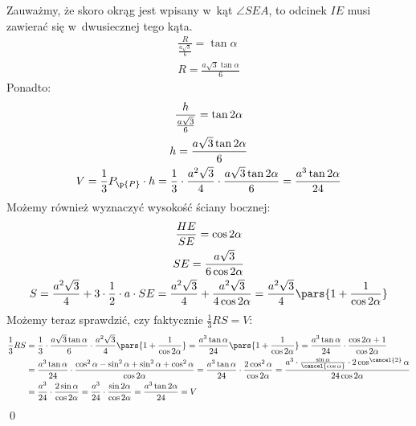 \noindent
Zauważmy, że skoro okrąg jest wpisany w~kąt \(\angle{SEA}\), to odcinek \(IE\) musi zawierać się w~dwusiecznej tego kąta.
\begin{gather*}
    \frac{R}{\frac{a\sqrt{3}}{6}} = \tan\alpha\\
    R = \frac{a\sqrt{3}\tan\alpha}{6}
\end{gather*}
Ponadto:
\begin{gather*}
    \frac{h}{\frac{a\sqrt{3}}{6}} = \tan2\alpha\\
    h = \frac{a\sqrt{3}\tan2\alpha}{6}\\
    V
    = \frac{1}{3}P_\p{P} \cdot h
    = \frac{1}{3} \cdot \frac{a^2\sqrt{3}}{4} \cdot \frac{a\sqrt{3}\tan2\alpha}{6}
    = \frac{a^3\tan2\alpha}{24}
\end{gather*}
Możemy również wyznaczyć wysokość ściany bocznej:
\begin{gather*}
    \frac{HE}{SE} = \cos2\alpha\\
    SE = \frac{a\sqrt{3}}{6\cos2\alpha}\\
    S
    = \frac{a^2\sqrt{3}}{4} + 3 \cdot \frac{1}{2} \cdot a \cdot SE
    = \frac{a^2\sqrt{3}}{4} + \frac{a^2\sqrt{3}}{4\cos2\alpha}
    = \frac{a^2\sqrt{3}}{4}\pars{1 + \frac{1}{\cos2\alpha}}
\end{gather*}
Możemy teraz sprawdzić, czy faktycznie \(\frac{1}{3}RS = V\):
\begin{equation*}
    \begin{split}
        \frac{1}{3}RS
        &= \frac{1}{3} \cdot \frac{a\sqrt{3}\tan\alpha}{6} \cdot \frac{a^2\sqrt{3}}{4}\pars{1 + \frac{1}{\cos2\alpha}}
        = \frac{a^3\tan\alpha}{24}\pars{1 + \frac{1}{\cos2\alpha}}
        = \frac{a^3\tan\alpha}{24} \cdot \frac{\cos2\alpha + 1}{\cos2\alpha}\\
        &= \frac{a^3\tan\alpha}{24} \cdot \frac{\cos^2\alpha - \sin^2\alpha + \sin^2\alpha + \cos^2\alpha}{\cos2\alpha}
        = \frac{a^3\tan\alpha}{24} \cdot \frac{2\cos^2\alpha}{\cos2\alpha}
        = \frac{a^3 \cdot \frac{\sin\alpha}{\cancel{\cos\alpha}} \cdot 2\cos^{\cancel{2}}\alpha}{24\cos2\alpha}\\
        &= \frac{a^3}{24} \cdot \frac{2\sin\alpha}{\cos2\alpha}
        = \frac{a^3}{24} \cdot \frac{\sin2\alpha}{\cos2\alpha}
        = \frac{a^3\tan2\alpha}{24}
        = V
    \end{split}
\end{equation*}
\qed
